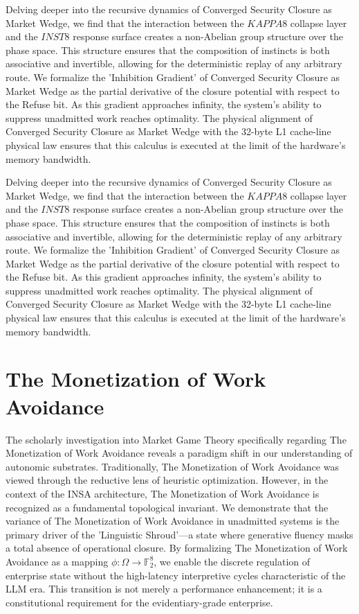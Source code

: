 \documentclass[12pt,a4paper,oneside]{book}
\begin{document}
Delving deeper into the recursive dynamics of Converged Security Closure as Market Wedge, we find that the interaction between the $KAPPA8$ collapse layer and the $INST8$ response surface creates a non-Abelian group structure over the phase space. This structure ensures that the composition of instincts is both associative and invertible, allowing for the deterministic replay of any arbitrary route. We formalize the 'Inhibition Gradient' of Converged Security Closure as Market Wedge as the partial derivative of the closure potential with respect to the Refuse bit. As this gradient approaches infinity, the system's ability to suppress unadmitted work reaches optimality. The physical alignment of Converged Security Closure as Market Wedge with the 32-byte L1 cache-line physical law ensures that this calculus is executed at the limit of the hardware's memory bandwidth. 

Delving deeper into the recursive dynamics of Converged Security Closure as Market Wedge, we find that the interaction between the $KAPPA8$ collapse layer and the $INST8$ response surface creates a non-Abelian group structure over the phase space. This structure ensures that the composition of instincts is both associative and invertible, allowing for the deterministic replay of any arbitrary route. We formalize the 'Inhibition Gradient' of Converged Security Closure as Market Wedge as the partial derivative of the closure potential with respect to the Refuse bit. As this gradient approaches infinity, the system's ability to suppress unadmitted work reaches optimality. The physical alignment of Converged Security Closure as Market Wedge with the 32-byte L1 cache-line physical law ensures that this calculus is executed at the limit of the hardware's memory bandwidth. 

\section{The Monetization of Work Avoidance}
The scholarly investigation into Market Game Theory specifically regarding The Monetization of Work Avoidance reveals a paradigm shift in our understanding of autonomic substrates. Traditionally, The Monetization of Work Avoidance was viewed through the reductive lens of heuristic optimization. However, in the context of the INSA architecture, The Monetization of Work Avoidance is recognized as a fundamental topological invariant. We demonstrate that the variance of The Monetization of Work Avoidance in unadmitted systems is the primary driver of the 'Linguistic Shroud'---a state where generative fluency masks a total absence of operational closure. By formalizing The Monetization of Work Avoidance as a mapping $\phi: \Omega \to \mathbb{F}_2^8$, we enable the discrete regulation of enterprise state without the high-latency interpretive cycles characteristic of the LLM era. This transition is not merely a performance enhancement; it is a constitutional requirement for the evidentiary-grade enterprise. 
\end{document}
